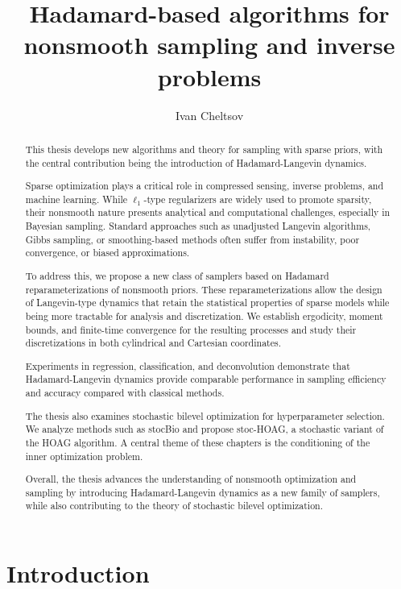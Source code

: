 \documentclass[11pt, twoside]{report}
\title{Hadamard-based algorithms for nonsmooth sampling and inverse problems}
\author{Ivan Cheltsov}
\begin{document}
\maketitle

\begin{abstract}
This thesis develops new algorithms and theory for sampling with sparse priors, with the central contribution being the introduction of Hadamard-Langevin dynamics.

Sparse optimization plays a critical role in compressed sensing, inverse problems, and machine learning. While $\ell_1$-type regularizers are widely used to promote sparsity, their nonsmooth nature presents analytical and computational challenges, especially in Bayesian sampling. Standard approaches such as unadjusted Langevin algorithms, Gibbs sampling, or smoothing-based methods often suffer from instability, poor convergence, or biased approximations.

To address this, we propose a new class of samplers based on Hadamard reparameterizations of nonsmooth priors. These reparameterizations allow the design of Langevin-type dynamics that retain the statistical properties of sparse models while being more tractable for analysis and discretization. We establish ergodicity, moment bounds, and finite-time convergence for the resulting processes and study their discretizations in both cylindrical and Cartesian coordinates.

Experiments in regression, classification, and deconvolution demonstrate that Hadamard-Langevin dynamics provide comparable performance in sampling efficiency and accuracy compared with classical methods.

The thesis also examines stochastic bilevel optimization for hyperparameter selection. We analyze methods such as stocBio and propose stoc-HOAG, a stochastic variant of the HOAG algorithm. A central theme of these chapters is the conditioning of the inner optimization problem.

Overall, the thesis advances the understanding of nonsmooth optimization and sampling by introducing Hadamard-Langevin dynamics as a new family of samplers, while also contributing to the theory of stochastic bilevel optimization.
\end{abstract}


\tableofcontents

\part*{Introduction}
\end{document}
